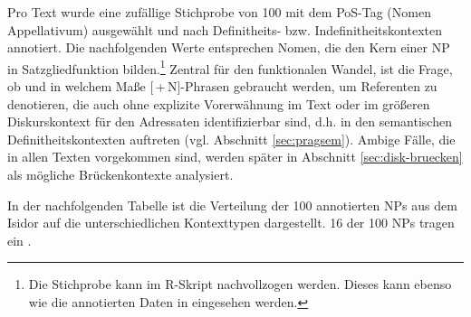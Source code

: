 Pro Text wurde eine zufällige Stichprobe von 100  mit dem PoS-Tag  (Nomen Appellativum)  ausgewählt und nach Definitheits- bzw. Indefinitheitskontexten annotiert. Die nachfolgenden Werte entsprechen Nomen, die den Kern einer NP in Satzgliedfunktion bilden.\footnote{Die Stichprobe kann im R-Skript  nachvollzogen werden. Dieses kann ebenso wie die annotierten Daten in \textcite{HZKYL4_2020} eingesehen werden.}   
Zentral für den funktionalen Wandel, ist die Frage, ob und in welchem Maße
[\,+\,N]-Phrasen  gebraucht werden, um Referenten zu denotieren, die auch ohne explizite Vorerwähnung im Text oder im größeren Diskurskontext für den Adressaten identifizierbar sind, d.h. in den semantischen Definitheitskontexten  auftreten (vgl. Abschnitt \ref{sec:pragsem}). Ambige Fälle, die in allen Texten vorgekommen sind, werden später in Abschnitt \ref{sec:disk-bruecken} als mögliche Brückenkontexte  analysiert. 


In der nachfolgenden Tabelle ist die Verteilung der 
100 annotierten NPs aus dem Isidor auf die unterschiedlichen Kontexttypen dargestellt. 16 der 100 NPs tragen ein .


